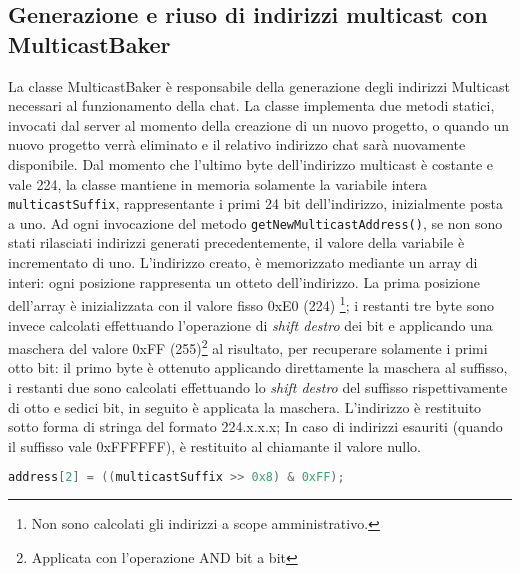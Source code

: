 \documentclass{article}
\begin{document}
\subsection{Generazione e riuso di indirizzi multicast con MulticastBaker}
La classe MulticastBaker è responsabile della generazione degli indirizzi Multicast necessari al funzionamento della chat. La classe implementa due metodi statici, invocati dal server al momento della creazione di un nuovo progetto, o quando un nuovo progetto verrà eliminato e il relativo indirizzo chat sarà nuovamente disponibile.
Dal momento che l'ultimo byte dell'indirizzo multicast è costante e vale 224, la classe mantiene in memoria solamente la variabile intera \texttt{multicastSuffix}, rappresentante i primi 24 bit dell'indirizzo, inizialmente posta a uno. Ad ogni invocazione del metodo \texttt{getNewMulticastAddress()}, se non sono stati rilasciati indirizzi generati precedentemente, il valore della variabile è incrementato di uno. L'indirizzo creato, è memorizzato mediante un array di interi: ogni posizione rappresenta un otteto dell'indirizzo. La prima posizione dell'array è inizializzata con il valore fisso 0xE0 (224)
\footnote{Non sono calcolati gli indirizzi a scope amministrativo.}; i restanti tre byte sono invece calcolati effettuando l'operazione di \emph{shift destro} dei bit e applicando una maschera del valore 0xFF (255)\footnote{Applicata con l'operazione AND bit a bit} al risultato, per recuperare solamente i primi otto bit: il primo byte è ottenuto applicando direttamente la maschera al suffisso, i restanti due sono calcolati effettuando lo \emph{shift destro} del suffisso rispettivamente di otto e sedici bit, in seguito è applicata la maschera. L'indirizzo è restituito sotto forma di stringa del formato 224.x.x.x;
In caso di indirizzi esauriti (quando il suffisso vale 0xFFFFFF), è restituito al chiamante il valore nullo.\newline
\begin{lstlisting}[language=Java, caption=Inizializzazione del secondo byte dell'indirizzo]
    address[2] = ((multicastSuffix >> 0x8) & 0xFF); 
\end{lstlisting}
\end{document}
